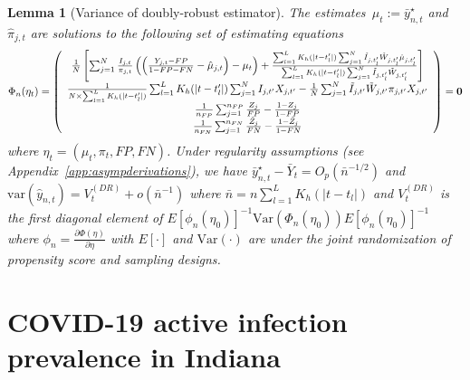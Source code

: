 \documentclass[11pt]{amsart}
\numberwithin{equation}{section}
\theoremstyle{plain}
\newtheorem{lemma}[theorem]{Lemma}
\begin{document}
 \begin{lemma}[Variance of doubly-robust estimator] \normalfont
 \label{lemma:dr}
 The estimates~$\mu_t := \bar y_{n,t}^\star$ and $\hat \pi_{j,t}$
 are solutions to the following set of estimating equations
 $$
 \Phi_n (\eta_t) =
 \left (
 \begin{array}{c}
 \frac{1}{N} \left[ \sum_{j=1}^N \frac{I_{j,t}}{\pi_{j,t}} \left( \left( \frac{Y_{j,t} - FP}{1-FP-FN} - \hat \mu_{j,t}  \right)  - \mu_t \right) + \frac{\sum_{l=1}^L K_{h} (|t - t_l^\prime|) \sum_{j=1}^N \tilde I_{j,t_l^\prime} \tilde W_{j,t_l^\prime} \hat \mu_{j,t_l^\prime}}{\sum_{l=1}^L K_{h} (|t - t_l^\prime|) \sum_{j=1}^N \tilde I_{j,t_l^\prime} \tilde W_{j,t_l^\prime}} \right] \\
 \frac{1}{N \times \sum_{l=1}^L K_{h} (|t - t_l^\prime|)} \sum_{l=1}^L K_{h} (|t - t_l^\prime|) \sum_{j=1}^N I_{j,t^\prime} X_{j,t^\prime} - \frac{1}{N} \sum_{j = 1}^N \tilde I_{j,t^\prime} \tilde W_{j,t^\prime}  \pi_{j,t^\prime} X_{j,t^\prime}  \\
 \frac{1}{n_{FP}} \sum_{j=1}^{n_{FP}} \frac{Z_j}{FP} - \frac{1-Z_j}{1-FP} \\
 \frac{1}{n_{FN}} \sum_{j=1}^{n_{FN}} \frac{\tilde Z_j}{FN} - \frac{1-\tilde Z_j}{1-FN} \\
 \end{array}
 \right ) = {\bf 0}
 $$
 where $\eta_t = (\mu_t, \pi_t, FP, FN)$. Under regularity assumptions (see Appendix~\ref{app:asympderivations}), we have $\bar y_{n,t}^\star - \bar Y_{t} = O_p (\bar n^{-1/2})$ and $\text{var} (\hat y_{n,t}) = V_{t}^{(DR)} + o (\bar n^{-1})$ where $\bar n = n \sum_{l=1}^L K_h(|t-t_l|)$ and $V_t^{(DR)}$ is the first diagonal element of $E [\phi_n(\eta_0)]^{-1} \text{Var}(\Phi_n(\eta_0))E [\phi_n(\eta_0)]^{-1}$ where $\phi_n = \frac{\partial \Phi (\eta)}{\partial \eta}$ with $E[\cdot]$ and $\text{Var} (\cdot)$ are under the joint randomization of propensity score and sampling designs.
 \end{lemma}


 \section{COVID-19 active infection prevalence in Indiana}
 \label{section:applications}

\end{document}
